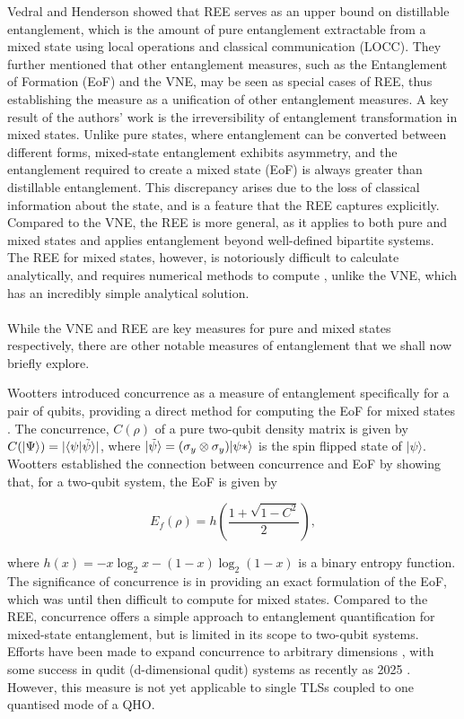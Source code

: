 \documentclass[12pt,a4paper]{article}
\begin{document}
Vedral and Henderson showed that REE serves as an upper bound on distillable entanglement, which is the amount of pure entanglement extractable from a mixed state using local operations and classical communication (LOCC). They further mentioned that other entanglement measures, such as the Entanglement of Formation (EoF) and the VNE, may be seen as special cases of REE, thus establishing the measure as a unification of other entanglement measures. A key result of the authors' work is the irreversibility of entanglement transformation in mixed states. Unlike pure states, where entanglement can be converted between different forms, mixed-state entanglement exhibits asymmetry, and the entanglement required to create a mixed state (EoF) is always greater than distillable entanglement. This discrepancy arises due to the loss of classical information about the state, and is a feature that the REE captures explicitly. Compared to the VNE, the REE is more general, as it applies to both pure and mixed states and applies entanglement beyond well-defined bipartite systems. The REE for mixed states, however, is notoriously difficult to calculate analytically, and requires numerical methods to compute \cite{Entanglement2009-REE_VNapplied}, unlike the VNE, which has an incredibly simple analytical solution. \\
\\
While the VNE and REE are key measures for pure and mixed states respectively, there are other notable measures of entanglement that we shall now briefly explore. 

Wootters introduced concurrence as a measure of entanglement specifically for a pair of qubits, providing a direct method for computing the EoF for mixed states \cite{Entanglement2001-WC_qubits}. The concurrence, $C(\rho)$ of a pure two-qubit density matrix is given by $C(|\Psi\rangle) = |\langle\psi|\Tilde{\psi}\rangle|$, where $|\Tilde{\psi}\rangle = (\sigma_y\otimes\sigma_y)|\psi*\rangle$ is the spin flipped state of $|\psi\rangle$. Wootters established the connection between concurrence and EoF by showing that, for a two-qubit system, the EoF is given by

\begin{equation}
    E_f(\rho) = h\left(\frac{1+\sqrt{1-C^2}}{2}\right),
\end{equation} 

where $h(x) = - x\log_2x - (1 - x)\log_2(1 -x)$ is a binary entropy function. The significance of concurrence is in providing an exact formulation of the EoF, which was until then difficult to compute for mixed states. Compared to the REE, concurrence offers a simple approach to entanglement quantification for mixed-state entanglement, but is limited in its scope to two-qubit systems. Efforts have been made to expand concurrence to arbitrary dimensions \cite{Entanglement2001-WC_arbdim}, with some success in qudit (d-dimensional qudit) systems as recently as 2025 \cite{Entanglement2025_WC_arbidm_example}. However, this measure is not yet applicable to single TLSs coupled to one quantised mode of a QHO.
\end{document}
